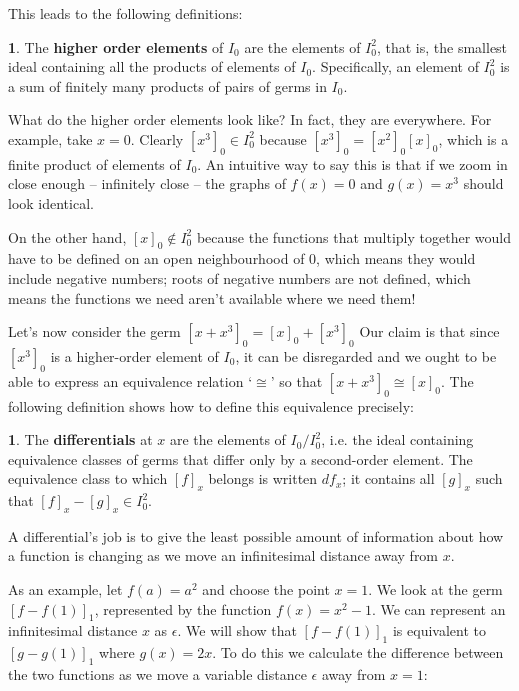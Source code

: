 \documentclass[oneside,english]{amsbook}
\numberwithin{section}{chapter}
\theoremstyle{plain}
\theoremstyle{definition}
\newtheorem{defn}[thm]{\protect\definitionname}
\providecommand{\definitionname}{Definition}
\begin{document}
			This leads to the following definitions: 
			
			\begin{defn}
				The \textbf{higher order elements} of $I_0$ are the elements of $I_0^2$, that is, the smallest ideal containing all the products of elements of $I_0$. Specifically, an element of $I_0^2$ is a sum of finitely many products of pairs of germs in $I_0$. 
			\end{defn}
			
			What do the higher order elements look like? In fact, they are everywhere. For example, take $x = 0$. Clearly $[x^3]_0\in I_0^2$ because $[x^3]_0 = [x^2]_0[x]_0$, which is a finite product of elements of $I_0$. An intuitive way to say this is that if we zoom in close enough -- infinitely close -- the graphs of $f(x) = 0$ and $g(x) = x^3$ should look identical. 
						
			On the other hand, $[x]_0\notin I_0^2$ because the functions that multiply together would have to be defined on an open neighbourhood of $0$, which means they would include negative numbers; roots of negative numbers are not defined, which means the functions we need aren't available where we need them! 
			
			Let's now consider the germ $[x + x^3]_0 = [x]_0 + [x^3]_0$ Our claim is that since $[x^3]_0$ is a higher-order element of $I_0$, it can be disregarded and we ought to be able to express an equivalence relation `$\cong$' so that $[x + x^3]_0 \cong [x]_0$. The following definition shows how to define this equivalence precisely:

			\begin{defn}
				The \textbf{differentials} at $x$ are the elements of $I_0/I_0^2$, i.e. the ideal containing equivalence classes of germs that differ only by a second-order element. The equivalence class to which $[f]_x$ belongs is written $df_x$; it contains all $[g]_x$ such that $[f]_x - [g]_x \in I_0^2$.
			\end{defn}
			
			A differential's job is to give the least possible amount of information about how a function is changing as we move an infinitesimal distance away from $x$.
			
			As an example, let $f(a) = a^2$ and choose the point $x = 1$. We look at the germ $[f - f(1)]_1$, represented by the function $f(x) =  x^2 - 1$. We can represent an infinitesimal distance $x$ as $\epsilon$. We will show that $[f - f(1)]_1$ is equivalent to  $[g - g(1)]_1$ where $g(x) = 2x$. To do this we calculate the difference between the two functions as we move a variable distance $\epsilon$ away from $x = 1$:
\end{document}
